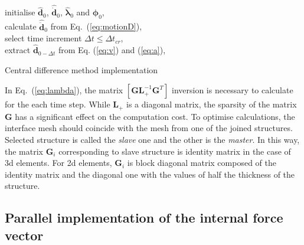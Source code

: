 \documentclass[a4paper,fleqn]{cas-dc}
\begin{document}
\begin{algorithm}
	\SetAlgoLined
	initialise  \(\widehat{\textbf{d}}_0\), \(\widehat{\dot{\textbf{d}}}_0\), \(\widehat{\boldsymbol{\lambda}}_0\) and \(\boldsymbol{\phi}_{0}\),\\
	calculate \(\widehat{\ddot{\textbf{d}}}_0\) from Eq.~(\ref{eq:motionD}),\\
	select time increment \(\Delta t\leq\Delta t_{cr}\),\\
	extract \(\widehat{\textbf{d}}_{0-\Delta t}\) from Eq. (\ref{eq:v}) and (\ref{eq:a}),\\
	\caption{Central difference method implementation}
	\label{alg:cdm}
\end{algorithm}

In Eq.~(\ref{eq:lambda}), the matrix \(\left [\textbf{GL}_+^{-1}\textbf{G}^T\right ]\) inversion is necessary to calculate for the each time step.
While \(\textbf{L}_+\) is a diagonal matrix, the sparsity of the matrix \(\textbf{G}\) has a significant effect on the computation cost.
To optimise calculations, the interface mesh should coincide with the mesh from one of the joined structures.
Selected structure is called the \textit{slave} one and the other is the \textit{master}.
In this way, the matrix \(\mathbf{G}_i\) corresponding to slave structure is identity matrix in the case of \ac{3d} elements.
For \ac{2d} elements, \(\mathbf{G}_i\) is block diagonal matrix composed of the identity matrix and the diagonal one with the values of half the thickness of the structure.
\subsection{Parallel implementation of the internal force vector}
\label{sec:gpu}
\end{document}
